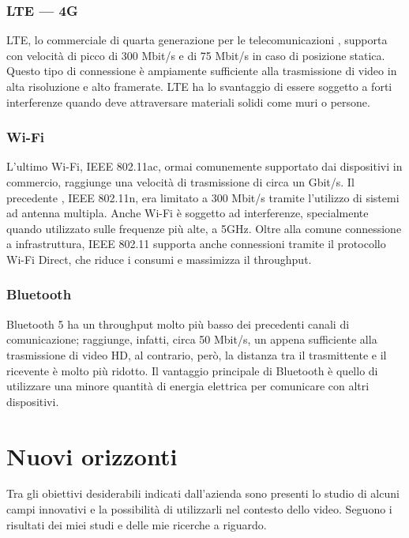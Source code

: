 		\subsubsection{LTE --- 4G}
			\gls{LTE}, lo  commerciale di quarta generazione per le telecomunicazioni , supporta  con velocità di picco di 300 Mbit/s e  di 75 Mbit/s in caso di posizione statica. Questo tipo di connessione è ampiamente sufficiente alla trasmissione di video in alta risoluzione e alto framerate. \gls{LTE} ha lo svantaggio di essere soggetto a forti interferenze quando deve attraversare materiali solidi come muri o persone.
		\subsubsection{Wi-Fi}
			L'ultimo  Wi-Fi, \acrshort{IEEE} 802.11ac, ormai comunemente supportato dai dispositivi  in commercio, raggiunge una velocità di trasmissione di circa un Gbit/s. Il precedente , \acrshort{IEEE} 802.11n, era limitato a 300 Mbit/s tramite l'utilizzo di sistemi ad antenna multipla. Anche Wi-Fi è soggetto ad interferenze, specialmente quando utilizzato sulle frequenze più alte, a 5GHz. Oltre alla comune connessione a infrastruttura, \acrshort{IEEE} 802.11 supporta anche connessioni  tramite il protocollo Wi-Fi Direct, che riduce i consumi e massimizza il throughput.
		\subsubsection{Bluetooth}
			Bluetooth 5 ha un throughput molto più basso dei precedenti canali di comunicazione; raggiunge, infatti, circa 50 Mbit/s, un  appena sufficiente alla trasmissione di video HD, al contrario, però, la distanza tra il trasmittente e il ricevente è molto più ridotto. Il vantaggio principale di Bluetooth è quello di utilizzare una minore quantità di energia elettrica per comunicare con altri dispositivi.

\section{Nuovi orizzonti}
Tra gli obiettivi desiderabili indicati dall'azienda sono presenti lo studio di alcuni campi innovativi e la possibilità di utilizzarli nel contesto dello  video. Seguono i risultati dei miei studi e delle mie ricerche a riguardo.

